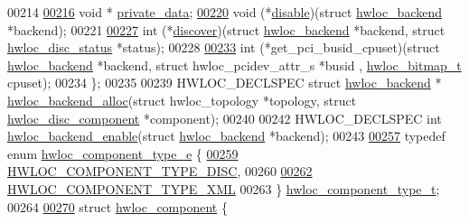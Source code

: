 \begin{DoxyCode}
00214 
\hyperlink{a00374_a2ea5bd36b7f06efdb65b98b32af16c68}{00216}   \textcolor{keywordtype}{void} * \hyperlink{a00374_a2ea5bd36b7f06efdb65b98b32af16c68}{private\_data};
\hyperlink{a00374_a36c4fa86350525b46340c67b802c69c7}{00220}   void (*\hyperlink{a00374_a36c4fa86350525b46340c67b802c69c7}{disable})(\textcolor{keyword}{struct }\hyperlink{a00374}{hwloc\_backend} *backend);
00221 
\hyperlink{a00374_accff2cd8404be43c3b44cec05e6f609b}{00227}   int (*\hyperlink{a00374_accff2cd8404be43c3b44cec05e6f609b}{discover})(\textcolor{keyword}{struct }\hyperlink{a00374}{hwloc\_backend} *backend, \textcolor{keyword}{struct }
      \hyperlink{a00370}{hwloc\_disc\_status} *status);
00228 
\hyperlink{a00374_aaac253491264c20930f44817270bc502}{00233}   int (*get\_pci\_busid\_cpuset)(\textcolor{keyword}{struct }\hyperlink{a00374}{hwloc\_backend} *backend, \textcolor{keyword}{struct }hwloc\_pcidev\_attr\_s *busid
      , \hyperlink{a00205_gaa3c2bf4c776d603dcebbb61b0c923d84}{hwloc\_bitmap\_t} cpuset);
00234 \};
00235 
00239 HWLOC\_DECLSPEC \textcolor{keyword}{struct }\hyperlink{a00374}{hwloc\_backend} * \hyperlink{a00228_gadb068565ab6043cbe4d16bfcce067a61}{hwloc\_backend\_alloc}(\textcolor{keyword}{struct} 
      hwloc\_topology *topology, \textcolor{keyword}{struct} \hyperlink{a00366}{hwloc\_disc\_component} *component);
00240 
00242 HWLOC\_DECLSPEC \textcolor{keywordtype}{int} \hyperlink{a00228_ga4715779d7191833e9b1a7490989a7497}{hwloc\_backend\_enable}(\textcolor{keyword}{struct} \hyperlink{a00374}{hwloc\_backend} *backend);
00243 
\hyperlink{a00229_ga397a1bf7d21dd073320ad0045340f463}{00257} \textcolor{keyword}{typedef} \textcolor{keyword}{enum} \hyperlink{a00229_ga397a1bf7d21dd073320ad0045340f463}{hwloc\_component\_type\_e} \{
\hyperlink{a00229_gga397a1bf7d21dd073320ad0045340f463a5d6e561f467fe9795a29e7368b613900}{00259}   \hyperlink{a00229_gga397a1bf7d21dd073320ad0045340f463a5d6e561f467fe9795a29e7368b613900}{HWLOC\_COMPONENT\_TYPE\_DISC},
00260 
\hyperlink{a00229_gga397a1bf7d21dd073320ad0045340f463adea00cd839c2141c032e1569fd5592bd}{00262}   \hyperlink{a00229_gga397a1bf7d21dd073320ad0045340f463adea00cd839c2141c032e1569fd5592bd}{HWLOC\_COMPONENT\_TYPE\_XML}
00263 \} \hyperlink{a00229_ga0aebfa65317af10bb18d7d35f6dc05b8}{hwloc\_component\_type\_t};
00264 
\hyperlink{a00378}{00270} \textcolor{keyword}{struct }\hyperlink{a00378}{hwloc\_component} \{

\end{DoxyCode}
